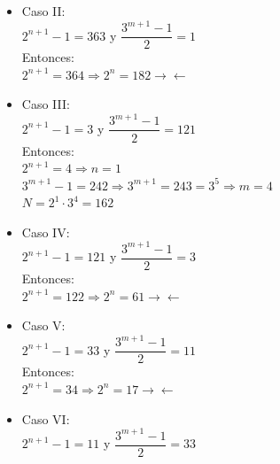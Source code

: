 \documentclass[12pt,a4paper, reqno]{article}
\begin{document}
\begin{enumerate}
\begin{itemize}
\begin{itemize}
        Entonces:\\

        $2^{n+1}=2 \Rightarrow n=0$\\

        $3^{m+1}-1=726 \Rightarrow 3^{m+1}=727 \rightarrow \leftarrow$

         \item Caso II:\\
        $2^{n+1}-1=363$ y $\dfrac{3^{m+1}-1}{2}=1$\\

        Entonces:\\

        $2^{n+1}=364 \Rightarrow 2^{n}=182 \rightarrow \leftarrow$\\

         \item Caso III:\\
        $2^{n+1}-1=3$ y $\dfrac{3^{m+1}-1}{2}=121$\\

        Entonces:\\

        $2^{n+1}=4 \Rightarrow n=1$\\

        $3^{m+1}-1=242 \Rightarrow 3^{m+1}=243=3^5 \Rightarrow m=4$\\

        $N=2^1 \cdot 3^4=162$

         \item Caso IV:\\
        $2^{n+1}-1=121$ y $\dfrac{3^{m+1}-1}{2}=3$\\

        Entonces:\\

       $2^{n+1}=122 \Rightarrow 2^{n}=61 \rightarrow \leftarrow$\\

        \item Caso V:\\
        $2^{n+1}-1=33$ y $\dfrac{3^{m+1}-1}{2}=11$\\

        Entonces:\\

       $2^{n+1}=34 \Rightarrow 2^{n}=17 \rightarrow \leftarrow$\\

        \item Caso VI:\\
        $2^{n+1}-1=11$ y $\dfrac{3^{m+1}-1}{2}=33$\\


\end{itemize}
\end{itemize}
\end{enumerate}
\end{document}
